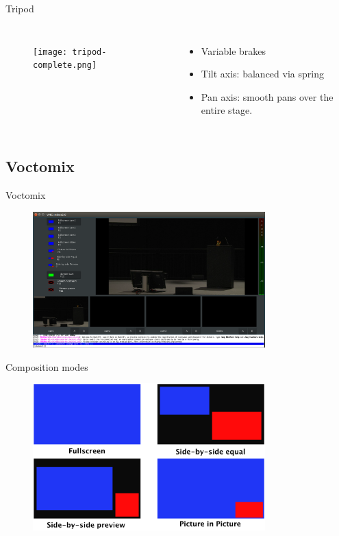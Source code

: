 \documentclass[hyperref={pdfpagelabels=false},aspectratio=169]{beamer}
\begin{document}
\begin{frame}{Tripod} 		%
	\begin{columns}[T,onlytextwidth]
	\begin{figure} 
		\centering
		\texttt{[image: tripod-complete.png]}
	\end{figure}
	\begin{itemize}
	\item Variable brakes
 	\item Tilt axis: balanced via spring
 	\item Pan axis: smooth pans over the entire stage.
		\end{itemize}
	\end{columns}
\end{frame}

\subsection{Voctomix} %
\begin{frame}{Voctomix}
	\begin{figure} 
		\centering
		\includegraphics[width=0.8\textwidth]{voctomix.png}
	\end{figure}
\end{frame}

\begin{frame}{Composition modes} %
	\begin{figure} 
		\centering
		\includegraphics[width=0.8\textwidth]{composition_modes.png}
	\end{figure}
\end{frame}
\end{document}
